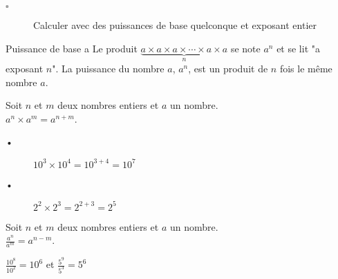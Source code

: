 \begin{titre}

\end{titre}


\begin{CpsCol}
\textbf{}
\begin{description}
\item[$\square$] Calculer avec des puissances de base quelconque et exposant entier
\end{description}
\end{CpsCol}



\begin{DefT}{Puissance de base a}
Le produit $\underbrace{a \times a \times a \times \cdots \times a \times a}_n$ se note $a^n$ et se lit "a exposant $n$".  
La puissance du nombre $a$, $a^n$, est un produit de $n$ fois le même nombre $a$.
\end{DefT}
 
\begin{minipage}[t]{0.49\linewidth}
\begin{Prop}
Soit $n$ et $m$ deux nombres entiers et $a$ un nombre.\\
$a^n \times a^m = a^{n+m}$.
\end{Prop}
 \begin{Ex}
 \begin{description}
 \item[•] $10^3 \times 10^4 = 10^{3+4}=10^7$
 \item[•] $2^2 \times 2^3 = 2^{2+3}=2^5$ 
  \end{description}
 \end{Ex}
\end{minipage}
 \hfill
\begin{minipage}[t]{0.49\linewidth}
\begin{Prop}
Soit $n$ et $m$ deux nombres entiers et $a$ un nombre.\\
$\frac{a^n}{a^m} = a^{n-m}$.
\end{Prop}
 \begin{Ex}
$\frac{10^8}{10^2} = 10^6$ et $\frac{5^9}{5^3} = 5^6$
 \end{Ex}
\end{minipage}
 

\begin{minipage}{0.48\linewidth}

\end{minipage}
\hfill
\begin{minipage}{0.48\linewidth}


\end{minipage}



